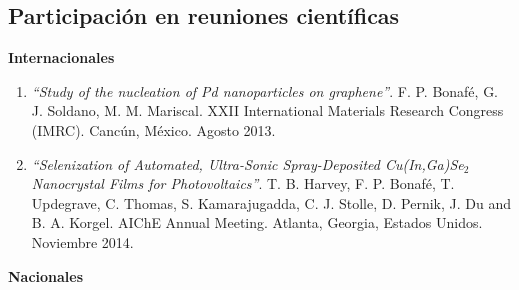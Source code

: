 \documentclass[10pt]{article}
\begin{document}
\subsection{Participación en reuniones científicas}
{\bf Internacionales}
\begin{enumerate}
 \item{\it ``Study of the nucleation of Pd nanoparticles on graphene''}. F. P. Bonafé, G. J. Soldano, M. M. Mariscal.
 XXII International Materials Research Congress (IMRC). Cancún, México. Agosto 2013.
 \item{\it ``Selenization of Automated, Ultra-Sonic Spray-Deposited Cu(In,Ga)Se$_2$ Nanocrystal Films for Photovoltaics''}. T. B. Harvey, F. P. Bonafé, T. Updegrave, C. Thomas, S. Kamarajugadda, C. J. Stolle, D. Pernik, J. Du and B. A. Korgel. AIChE Annual Meeting. Atlanta, Georgia, Estados Unidos. Noviembre 2014.
\end{enumerate}
{\bf Nacionales}
\end{document}
